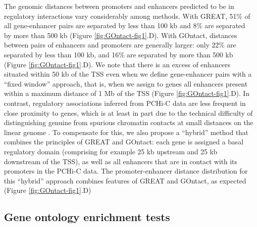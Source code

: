 The genomic distances between promoters and enhancers predicted to be in regulatory interactions vary considerably among methods. With GREAT, 51\% of all gene-enhancer pairs are separated by less than 100 kb and 8\% are separated by more than 500 kb (Figure \ref{fig:GOntact-fig1}.D). With GOntact, distances between pairs of enhancers and promoters are generally larger: only 22\% are separated by less than 100 kb, and 16\% are separated by more than 500 kb (Figure \ref{fig:GOntact-fig1}.D). We note that there is an excess of enhancers situated within 50 kb of the TSS even when we define gene-enhancer pairs with a “fixed window” approach, that is, when we assign to genes all enhancers present within a maximum distance of 1 Mb of the TSS (Figure \ref{fig:GOntact-fig1}.D). In contrast, regulatory associations inferred from PCHi-C data are less frequent in close proximity to genes, which is at least in part due to the technical difficulty of distinguishing genuine from spurious chromatin contacts at small distances on the linear genome \citep{cairns_chicago_2016}. To compensate for this, we also propose a “hybrid” method that combines the principles of GREAT and GOntact: each gene is assigned a basal regulatory domain (comprising for example 25 kb upstream and 25 kb downstream of the TSS), as well as all enhancers that are in contact with its promoters in the PCHi-C data. The promoter-enhancer distance distribution for this “hybrid” approach combines features of GREAT and GOntact, as expected (Figure \ref{fig:GOntact-fig1}.D)


\subsection{Gene ontology enrichment tests}

